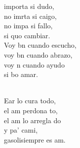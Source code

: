 \begin{cancion}%
	 importa si dudo,  \\
	no imrta si caigo,  \\
	no impa si fallo, \\
	si quo cambiar. \\
\jump
	Voy bn cuando escucho, \\
	voy bn cuando abrazo, \\
	voy n cuando ayudo \\
	si bo amar. \\\jump\\
	\begin{chorus}%
	Ear lo cura todo, \\
	el am perdona to, \\
	el am lo arregla do \\
	y pa' cami, \\
	gasolisiempre es am.\\
	\end{chorus}%
	\jump\\
\end{cancion}%
